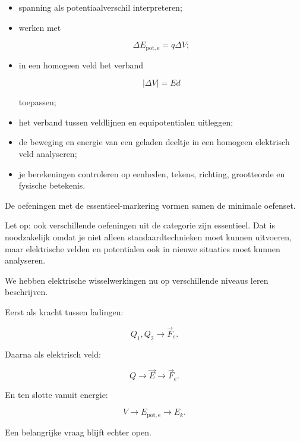 \documentclass{ximera}
\begin{document}
\begin{itemize}
  \item spanning als potentiaalverschil interpreteren;

  \item werken met

        \[
        \Delta E_{\mathrm{pot,e}}=q\Delta V;
        \]

  \item in een homogeen veld het verband

        \[
        |\Delta V|=Ed
        \]

        toepassen;

  \item het verband tussen veldlijnen en equipotentialen uitleggen;

  \item de beweging en energie van een geladen deeltje in een homogeen
        elektrisch veld analyseren;

  \item je berekeningen controleren op eenheden, tekens, richting,
        grootteorde en fysische betekenis.

\end{itemize}

De oefeningen met de essentieel-markering vormen samen de minimale
oefenset.

Let op: ook verschillende oefeningen uit de categorie
\oefU zijn essentieel. Dat is noodzakelijk omdat je niet alleen
standaardtechnieken moet kunnen uitvoeren, maar elektrische velden en
potentialen ook in nieuwe situaties moet kunnen analyseren.




We hebben elektrische wisselwerkingen nu op verschillende niveaus
leren beschrijven.

Eerst als kracht tussen ladingen:

\[
Q_1,Q_2
\longrightarrow
\vec F_e.
\]

Daarna als elektrisch veld:

\[
Q
\longrightarrow
\vec E
\longrightarrow
\vec F_e.
\]

En ten slotte vanuit energie:

\[
V
\longrightarrow
E_{\mathrm{pot,e}}
\longrightarrow
E_k.
\]

Een belangrijke vraag blijft echter open.
\end{document}
